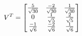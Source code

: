 \documentclass[preview]{standalone}
\begin{document}
\begin{align*}
\special{dvisvgm:raw <g id='unique000'>}V^T = \begin{bmatrix}\frac{5}{\sqrt{30}} & \frac{-2}{\sqrt{30}} & \frac{1}{\sqrt{30}} \\0 & \frac{1}{\sqrt{5}} & \frac{2}{\sqrt{5}} \\\frac{-1}{\sqrt{6}} & \frac{-2}{\sqrt{6}} & \frac{1}{\sqrt{6}}\end{bmatrix}\special{dvisvgm:raw </g>}
\end{align*}
\end{document}
